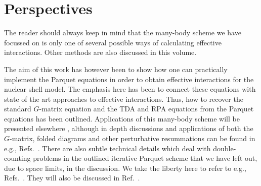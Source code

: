 \section{Perspectives}

\label{sec:sec6}

The reader should always 
keep in mind that the many-body scheme we have focussed on 
is only one of several
possible ways of calculating effective interactions. Other methods
are also discussed in this volume.

The aim of this work has however been to show how one can 
practically implement
the Parquet equations in order to obtain effective interactions
for the nuclear shell model. The emphasis here has been to connect
these equations 
with state of the art approaches to 
effective interactions. Thus, 
how to recover the standard $G$-matrix equation and
the TDA and RPA equations from the Parquet equations has been
outlined. Applications of this many-body scheme will be presented
elsewhere \cite{mhj99}, although in depth discussions and applications
of both
the $G$-matrix, folded diagrams and other perturbative 
resummations can be found in e.g., Refs.\ \cite{hko95,eo77}.
There are also subtle technical details which deal with 
double-counting problems in the outlined iterative Parquet scheme
that we have left out, due to space limits, 
in the discussion. We take the liberty here to
refer to e.g., Refs.\ \cite{jls82,scalapino}. They will also be discussed
in Ref.\ \cite{mhj99}.


